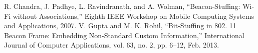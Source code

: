 \documentclass[letterpaper, 10 pt, conference]{ieeeconf}  %
\begin{document}







\begin{thebibliography}{99}

 R. Chandra, J. Padhye, L. Ravindranath, and A. Wolman, “Beacon-Stuffing: Wi-Fi without Associations,” Eighth IEEE Workshop on Mobile Computing Systems and Applications, 2007.
 V. Gupta and M. K. Rohil, “Bit-Stuffing in 802. 11 Beacon Frame: Embedding Non-Standard Custom Information,” International Journal of Computer Applications, vol. 63, no. 2, pp. 6–12, Feb. 2013.

\end{thebibliography}
\end{document}
